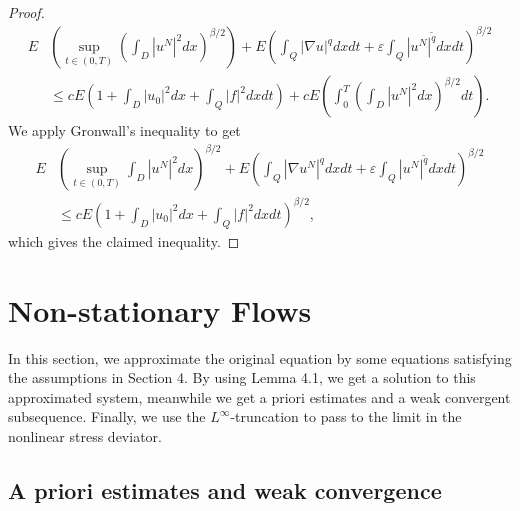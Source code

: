 \documentclass[reqno]{amsart}
\theoremstyle{definition}
\theoremstyle{remark}
\numberwithin{equation}{section} \allowdisplaybreaks
\begin{document}
\begin{proof}
\begin{equation*}
\begin{split}
E&\left(\sup_{t\in(0,T)}\left(\int_{D}|u^N|^2dx\right)^{\beta/2}\right)+E\left(\int_Q|\nabla u|^qdxdt+\varepsilon\int_Q|u^N|^{\tilde{q}}dxdt\right)^{\beta/2}\\
&\leq
cE\left(1+\int_{D}|u_0|^2dx+\int_Q|f|^2dxdt\right)+cE\left(\int_0^T\left(\int_{D}|u^N|^2dx\right)^{\beta/2}dt\right).
\end{split}
\end{equation*}
We apply Gronwall's inequality to get
\begin{equation}\label{4.38}
\begin{split}
E&\left(\sup_{t\in(0,T)}\int_{D}|u^N|^2dx\right)^{\beta/2}+E\left(\int_Q|\nabla u^N|^qdxdt+\varepsilon\int_Q|u^N|^{\tilde{q}}dxdt\right)^{\beta/2}\\
&\leq cE\left(1+\int_{D}|u_0|^2dx+\int_Q|f|^2dxdt\right)^{\beta/2},
\end{split}
\end{equation}
which gives the claimed inequality.
\end{proof}


\section{Non-stationary Flows}
In this section, we approximate the original equation by some
equations satisfying the assumptions in Section 4. By using Lemma
4.1, we get a solution to this approximated system, meanwhile we get
a priori estimates and a weak convergent subsequence. Finally, we
use the $L^{\infty}$-truncation to pass to the limit in the
nonlinear stress deviator.


\subsection{A priori estimates and weak convergence}
\end{document}
